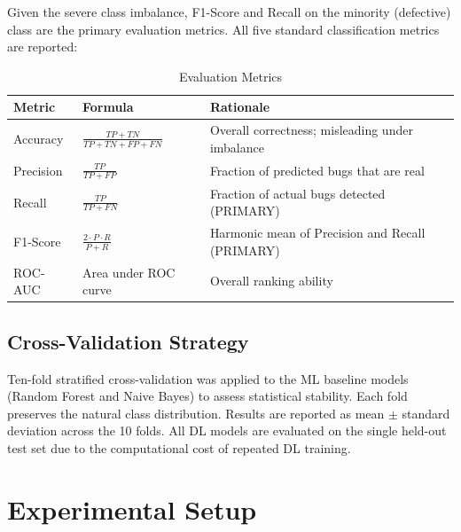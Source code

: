 \documentclass[12pt,a4paper,oneside]{report}
\begin{document}
Given the severe class imbalance, F1-Score and Recall on the minority (defective) class are the primary evaluation metrics. All five standard classification metrics are reported:

\begin{table}[H]
  \centering
  \caption{Evaluation Metrics}
  \label{tab:metrics}
  \begin{tabular}{L{25mm}L{45mm}L{75mm}}
    \toprule
    \textbf{Metric} & \textbf{Formula} & \textbf{Rationale} \\
    \midrule
    Accuracy   & $\frac{TP+TN}{TP+TN+FP+FN}$ & Overall correctness; misleading under imbalance \\
    Precision  & $\frac{TP}{TP+FP}$ & Fraction of predicted bugs that are real \\
    Recall     & $\frac{TP}{TP+FN}$ & Fraction of actual bugs detected (PRIMARY) \\
    F1-Score   & $\frac{2 \cdot P \cdot R}{P+R}$ & Harmonic mean of Precision and Recall (PRIMARY) \\
    ROC-AUC    & Area under ROC curve & Overall ranking ability \\
    \bottomrule
  \end{tabular}
\end{table}

\subsection{Cross-Validation Strategy}

Ten-fold stratified cross-validation was applied to the ML baseline models (Random Forest and Naive Bayes) to assess statistical stability. Each fold preserves the natural class distribution. Results are reported as mean $\pm$ standard deviation across the 10 folds. All DL models are evaluated on the single held-out test set due to the computational cost of repeated DL training.

\section{Experimental Setup}
\end{document}

